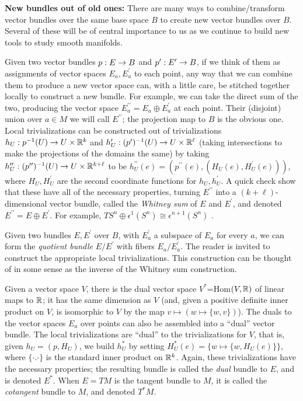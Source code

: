 {\bf New bundles out of old ones:} There are many ways to combine/transform 
vector bundles over the same base space $B$ to create new vector bundles over 
$B$. Several of these will be of central 
importance to us as we continue to build new tools to study smooth manifolds. 

\ssk

Given two vector bundles $p:E\rightarrow B$ and $p^\prime:E^\prime\rightarrow B$, if we think of them as
assignments of vector spaces $E_a,E_a^\prime$ to each point, any way that we can combine 
them to produce a new vector space can, with a little care, be stitched together locally
to construct a new bundle. For example, we can take the direct sum of the two, producing the
vector space $E_a^{\prime\prime}=E_a\oplus E_a^\prime$ at each point. Their (disjoint)
union over $a\in M$ we will call $E^{\prime\prime}$; the projection map to $B$ is
the obvious one. Local trivializations
can be constructed out of trivializations $h_U:p^{-1}(U)\rightarrow U\times {\Bbb R}^k$
and $h_U^\prime:(p^\prime)^{-1}(U)\rightarrow U\times {\Bbb R}^\ell$ (taking intersections to make the
projections of the domains the same) by taking 
$h_U^{\prime\prime}:(p^{\prime\prime})^{-1}(U)\rightarrow U\times {\Bbb R}^{k+\ell}$ to be 
$h_U^{\prime\prime}(e)=(p^{\prime\prime}(e),(H_U(e),H_U^\prime(e)))$, where
$H_U,H_U^\prime$ are the second coordinate functions for $h_U,h_U^\prime$. A quick check
show that these have all of the necessary properties, turning $E^{\prime\prime}$ into
a $(k+\ell)$-dimensional vector bundle, called the {\it Whitney sum} of $E$ and $E^\prime$,
and denoted $E^{\prime\prime}=E\oplus E^\prime$. For example, 
$TS^n\oplus \epsilon^1(S^n)\cong \epsilon^{n+1}(S^n)$ .

\ssk

Given two bundles $E,E^\prime$ over $B$, with $E^\prime_a$ a subspace of $E_a$ for every $a$,
we can form the {\it quotient bundle} $E/E^\prime$ with fibers $E_a/E^\prime_a$. The reader is 
invited to construct the appropriate local trivializations. This construction can be thought 
of in some sense as the inverse of the Whitney sum construction.

\ssk

Given a vector space $V$, there is the dual vector space $V^*$=Hom$(V,{\Bbb R})$ of linear maps
to ${\Bbb R}$; it has the same dimension as $V$ (and, given a positive definite inner product
on $V$, is isomorphic to $V$ by the map $v\mapsto (w\mapsto \lbrace w,v\rbrace)$). The duals
to the vector spaces $E_a$ over points can 
also be assembled into a ``dual'' vector bundle. The local trivializations are ``dual'' to the 
trivializations for $V$, that is, given $h_U=(p,H_U)$, we build $h_U^*$ by setting 
$H_U^*(e)=\{w\mapsto \lbrace w,H_U(e)\rbrace\}$, where $\lbrace\cdot.\cdot\rbrace$ is the standard
inner product on ${\Bbb R}^k$. Again, these trivializations have the necessary properties; the resulting
bundle is called the {\it dual} bundle to $E$, and is denoted $E^*$. When $E=TM$ is the tangent
bundle to $M$, it is called the {\it cotangent} bundle to $M$, and denoted $T^*M$.

